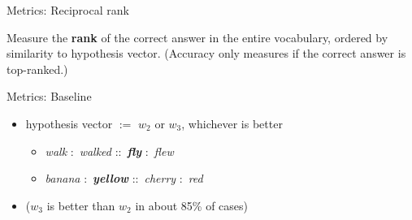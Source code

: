 \documentclass{beamer}
\begin{document}
\begin{frame}{Metrics: Reciprocal rank}

Measure the \textbf{rank} of the correct answer in the entire vocabulary, ordered by similarity to hypothesis vector.
(Accuracy only measures if the correct answer is top-ranked.)
\vspace{.3cm}


\end{frame}
\begin{frame}{Metrics: Baseline}

\begin{itemize}
\item[] hypothesis vector $:=$ $w_2$ or $w_3$, whichever is better
\begin{itemize}
\item[] \emph{walk} :~\emph{walked} ::~\emph{\textbf{fly}} :~\emph{flew}
\item[] \emph{banana} :~\emph{\textbf{yellow}} ::~\emph{cherry} :~\emph{red}
\end{itemize}
\item ($w_3$ is better than $w_2$ in about 85\% of cases)
\end{itemize}


\vspace{.3cm}

%

\end{frame}
\end{document}
